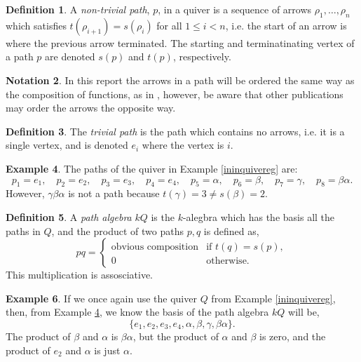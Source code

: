 \documentclass[11.5pt, twoside, a4paper, titlepage]{report}
\providecommand{\equ}[0]{\begin{equation*}}
\providecommand{\eequ}[0] {\end{equation*}}
\theoremstyle{definition}
\newtheorem{mydef}{Definition}[section]
\newtheorem{note}[mydef]{Notation}
\newtheorem{eg}[mydef]{Example}
\theoremstyle{plain}
\begin{document}
\begin{mydef}
A \emph{non-trivial path}, $p$, in a quiver is a sequence of arrows $\rho_1, \dots, \rho_n$ which satisfies $t(\rho_{i+1})=s(\rho_i)$ for all $1\leq i <n$, i.e. the start of an arrow is where the previous arrow terminated. The starting and terminatinating vertex of a path $p$ are denoted $s(p)$ and $t(p)$, respectively.
\end{mydef}

\begin{note}
In this report the arrows in a path will be ordered the same way as the composition of functions, as in \cite{CB2}, however, be aware that other publications may order the arrows the opposite way.
\end{note}

\begin{mydef}
The \emph{trivial path} is the path which contains no arrows, i.e. it is a single vertex, and is denoted $e_i$ where the vertex is $i$.
\end{mydef}

\begin{eg} \label{ininpatheg}
The paths of the quiver in Example \ref{ininquivereg} are:
\equ
p_1=e_1, \quad p_2=e_2, \quad p_3=e_3, \quad p_4=e_4, \quad p_5=\alpha, \quad p_6=\beta, \quad p_7=\gamma, \quad p_8=\beta\alpha.
\eequ
However, $\gamma\beta\alpha$ is not a path because $t(\gamma)=3\neq s(\beta)=2$.
\end{eg}

\begin{mydef}
A \emph{path algebra} $kQ$ is the $k$-alegbra which has the basis all the paths in $Q$, and the product of two paths $p,q$ is defined as,
\equ
pq=\begin{cases}
\text{obvious composition} & \text{if } t(q)=s(p),\\
0 & \text{otherwise.}
\end{cases}
\eequ
This multiplication is assosciative.
\end{mydef}

\begin{eg}
If we once again use the quiver $Q$ from Example \ref{ininquivereg}, then, from Example \ref{ininpatheg}, we know the basis of the path algebra $kQ$ will be,
\equ
\{e_1, e_2, e_3, e_4,\alpha, \beta, \gamma, \beta\alpha\}.
\eequ
The product of $\beta$ and $\alpha$ is $\beta\alpha$, but the product of $\alpha$ and $\beta$ is zero, and the product of $e_2$ and $\alpha$ is just $\alpha$.
\end{eg}
\end{document}
